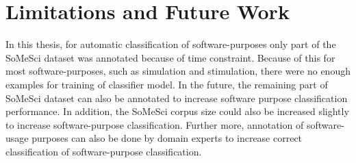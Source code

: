 \section{Limitations and Future Work}
\label{sec:chapter07:futurework}

In this thesis, for automatic classification of software-purposes only part of the \ac{SoMeSci} dataset was annotated because of time constraint. Because of this for most software-purposes, such as simulation and stimulation, there were no enough examples for training of classifier model. In the future, the remaining part of SoMeSci dataset can also be annotated to increase software purpose classification performance. In addition, the SoMeSci corpus size could also be increased slightly to increase software-purpose classification. Further more, annotation of software-usage purposes can also be done by domain experts to increase correct classification of software-purpose classification. 




